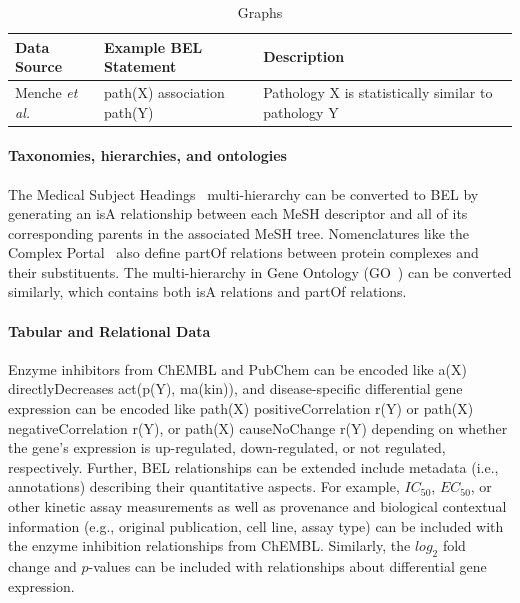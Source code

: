 \begin{table}[h!]
\caption{Graphs}
\label{tab:statements3}
\begin{tabular}{lll}
\hline
  Data Source            & Example BEL Statement                     & Description \\
\hline
  Menche \textit{et al.} & path(X) association path(Y)               & Pathology X is statistically similar to pathology Y\\
\end{tabular}
\end{table}


\paragraph*{Taxonomies, hierarchies, and ontologies}

The Medical Subject Headings~\cite{ROGERS1963} multi-hierarchy can be converted to BEL by generating an isA relationship between each MeSH descriptor and all of its corresponding parents in the associated MeSH tree.
Nomenclatures like the Complex Portal~\cite{Meldal2015} also define partOf relations between protein complexes and their substituents.
The multi-hierarchy in Gene Ontology (GO~\cite{Carbon2017}) can be converted similarly, which contains both isA relations and partOf relations.

\paragraph*{Tabular and Relational Data}

Enzyme inhibitors from ChEMBL and PubChem can be encoded like a(X) directlyDecreases act(p(Y), ma(kin)), and disease-specific differential gene expression can be encoded like path(X) positiveCorrelation r(Y) or path(X) negativeCorrelation r(Y), or path(X) causeNoChange r(Y) depending on whether the gene's expression is up-regulated, down-regulated, or not regulated, respectively.
Further, BEL relationships can be extended include metadata (i.e., annotations) describing their quantitative aspects.
For example, $IC_{50}$, $EC_{50}$, or other kinetic assay measurements as well as provenance and biological contextual information (e.g., original publication, cell line, assay type) can be included with the enzyme inhibition relationships from ChEMBL\@.
Similarly, the $log_2$ fold change and $p$-values can be included with relationships about differential gene expression.

